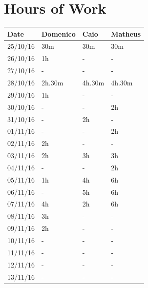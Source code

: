 \documentclass[a4paper]{article}
\begin{document}
\section{Hours of Work}
\begin{tabular}{ | l | l | l | l | }
\hline
	\textbf {Date} & \textbf {Domenico} & \textbf {Caio} & \textbf {Matheus} \\ \hline
	25/10/16& 30m & 30m & 30m \\ \hline
	26/10/16& 1h & -  & -  \\ \hline
	27/10/16&  - & - & -  \\ \hline
	28/10/16& 2h.30m & 4h.30m & 4h.30m \\ \hline
	29/10/16& 1h & -  & - \\ \hline
	30/10/16&  - & - & 2h\\ \hline
	31/10/16&  - & 2h & - \\ \hline
	01/11/16&  - & - & 2h \\ \hline
	02/11/16&  2h & - & - \\ \hline
	03/11/16&  2h & 3h & 3h \\ \hline
	04/11/16&  - & - & 2h\\ \hline
	05/11/16&  1h & 4h &  6h\\ \hline
	06/11/16&  - & 5h & 6h\\ \hline
	07/11/16& 4h & 2h & 6h \\ \hline
	08/11/16&  3h & - & - \\ \hline
	09/11/16&  2h & - & - \\ \hline
	10/11/16&  - & - & - \\ \hline
	11/11/16&  - & - & - \\ \hline
	12/11/16&  - & - & - \\ \hline
	13/11/16&  - & - & - \\ \hline
\end{tabular}

\newpage
\end{document}
